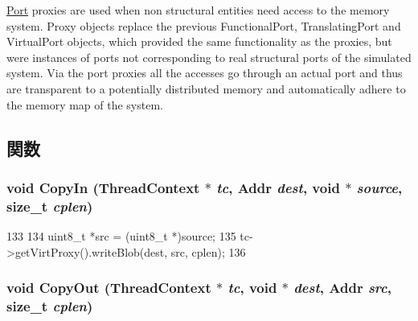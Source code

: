 \hyperlink{classPort}{Port} proxies are used when non structural entities need access to the memory system. Proxy objects replace the previous FunctionalPort, TranslatingPort and VirtualPort objects, which provided the same functionality as the proxies, but were instances of ports not corresponding to real structural ports of the simulated system. Via the port proxies all the accesses go through an actual port and thus are transparent to a potentially distributed memory and automatically adhere to the memory map of the system. 

\subsection{関数}
\hypertarget{fs__translating__port__proxy_8hh_aebd8031c1b14c8ee120ea9a924f4820a}{
\subsubsection[{CopyIn}]{\setlength{\rightskip}{0pt plus 5cm}void CopyIn ({\bf ThreadContext} $\ast$ {\em tc}, \/  {\bf Addr} {\em dest}, \/  void $\ast$ {\em source}, \/  size\_\-t {\em cplen})}}
\label{fs__translating__port__proxy_8hh_aebd8031c1b14c8ee120ea9a924f4820a}



\begin{DoxyCode}
133 {
134     uint8_t *src = (uint8_t *)source;
135     tc->getVirtProxy().writeBlob(dest, src, cplen);
136 }
\end{DoxyCode}
\hypertarget{fs__translating__port__proxy_8hh_a532188374aa989b4aeff3e0a1dff22fe}{
\subsubsection[{CopyOut}]{\setlength{\rightskip}{0pt plus 5cm}void CopyOut ({\bf ThreadContext} $\ast$ {\em tc}, \/  void $\ast$ {\em dest}, \/  {\bf Addr} {\em src}, \/  size\_\-t {\em cplen})}}
\label{fs__translating__port__proxy_8hh_a532188374aa989b4aeff3e0a1dff22fe}




